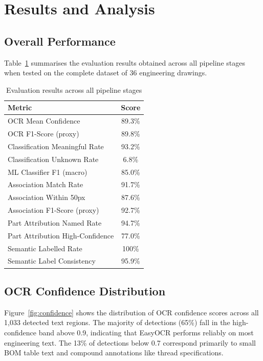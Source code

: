 \documentclass[12pt,a4paper]{article}
\begin{document}
\section{Results and Analysis}

\subsection{Overall Performance}

Table~\ref{tab:scorecard} summarises the evaluation results obtained across all pipeline stages when tested on the complete dataset of 36 engineering drawings.

\begin{table}[H]
\centering
\caption{Evaluation results across all pipeline stages}
\label{tab:scorecard}
\begin{tabular}{lc}
\toprule
\textbf{Metric} & \textbf{Score} \\
\midrule
OCR Mean Confidence & 89.3\% \\
OCR F1-Score (proxy) & 89.8\% \\
Classification Meaningful Rate & 93.2\% \\
Classification Unknown Rate & 6.8\% \\
ML Classifier F1 (macro) & 85.0\% \\
Association Match Rate & 91.7\% \\
Association Within 50px & 87.6\% \\
Association F1-Score (proxy) & 92.7\% \\
Part Attribution Named Rate & 94.7\% \\
Part Attribution High-Confidence & 77.0\% \\
Semantic Labelled Rate & 100\% \\
Semantic Label Consistency & 95.9\% \\
\bottomrule
\end{tabular}
\end{table}

\subsection{OCR Confidence Distribution}

Figure~\ref{fig:confidence} shows the distribution of OCR confidence scores across all 1,033 detected text regions. The majority of detections (65\%) fall in the high-confidence band above 0.9, indicating that EasyOCR performs reliably on most engineering text. The 13\% of detections below 0.7 correspond primarily to small BOM table text and compound annotations like thread specifications.
\end{document}
